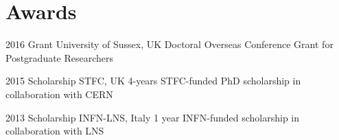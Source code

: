 \documentclass[print]{cv} %
\begin{document}
\clearpage\section{Awards}

\begin{entrylist}
  \entry
      {2016}
      {Grant}
      {University of Sussex, UK}
      {Doctoral Overseas Conference Grant for Postgraduate Researchers}

  \entry
      {2015}
      {Scholarship}
      {STFC, UK}
      {4-years STFC-funded PhD scholarship in collaboration with CERN}

  \entry
      {2013}
      {Scholarship}
      {INFN-LNS, Italy}
      {1 year INFN-funded scholarship in collaboration with LNS}
\end{entrylist}

 \begin{refsection} %
 \nocite{*}
     \printbibliography[type=inproceedings, title={International peer-reviewed conferences/proceedings}, heading=bibheading]
\end{refsection}
\raggedbottom
\end{document}
